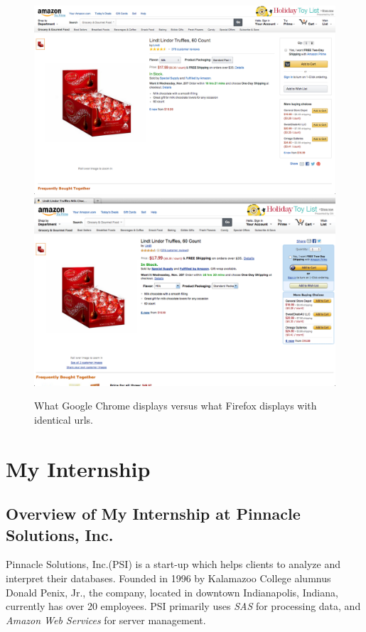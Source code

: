 \documentclass[12pt]{report}
\begin{document}
\begin{figure}[htp]
\includegraphics[width=\textwidth]{lindt_chrome.png}
\includegraphics[width=\textwidth]{lindt_firefox.png}
\caption[Comparison of same url in different browsers]
{What Google Chrome displays versus what Firefox displays with identical urls.}
\end{figure}

\chapter{My Internship}
\section{Overview of My Internship at Pinnacle Solutions, Inc.}
Pinnacle Solutions, Inc.(PSI) is a start-up which helps clients to analyze and interpret their databases. Founded in 1996 by Kalamazoo College alumnus Donald Penix, Jr., the company, located in downtown Indianapolis, Indiana, currently has over 20 employees. PSI primarily uses \textit{SAS} for processing data, and \textit{Amazon Web Services} for server management.
\end{document}
